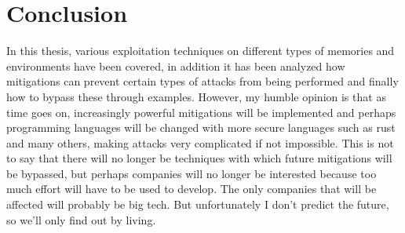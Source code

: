 \chapter{Conclusion}
    In this thesis, various exploitation techniques on different types of memories and environments have been covered, in addition it has been analyzed how mitigations can prevent certain types of attacks from being performed and finally how to bypass these through examples.\newline
    However, my humble opinion is that as time goes on, increasingly powerful mitigations will be implemented and perhaps programming languages will be changed with more secure languages such as rust and many others, making attacks very complicated if not impossible.\newline
    This is not to say that there will no longer be techniques with which future mitigations will be bypassed, but perhaps companies will no longer be interested because too much effort will have to be used to develop.\newline
    The only companies that will be affected will probably be big tech.\newline
    But unfortunately I don't predict the future, so we'll only find out by living.\newline
